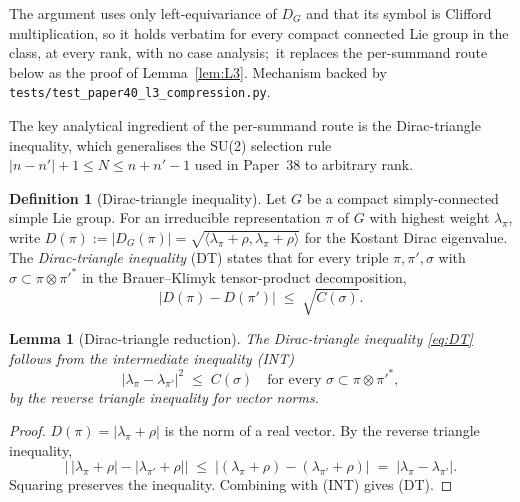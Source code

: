 \documentclass[11pt,a4paper]{article}
\theoremstyle{plain}
\newtheorem{lemma}[theorem]{Lemma}
\theoremstyle{definition}
\newtheorem{definition}[theorem]{Definition}
\newcommand{\Cas}{C}
\newcommand{\Dop}{D}
\begin{document}
\noindent The argument uses only left-equivariance of $\Dop_G$ and
that its symbol is Clifford multiplication, so it holds verbatim for
every compact connected Lie group in the class, at every rank, with no
case analysis;\ it replaces the per-summand route below as the proof of
Lemma~\ref{lem:L3}.  Mechanism backed by
\texttt{tests/test\_paper40\_l3\_compression.py}.

The key analytical ingredient of the per-summand route is the
Dirac-triangle inequality, which generalises the SU(2) selection rule
$|n - n'| + 1 \le N \le n + n' - 1$ used in Paper~38 to arbitrary
rank.

\begin{definition}[Dirac-triangle inequality]\label{def:dirac_triangle}
Let $G$ be a compact simply-connected simple Lie group. For an
irreducible representation $\pi$ of $G$ with highest weight
$\lambda_\pi$, write
$\Dop(\pi) := |\Dop_G(\pi)| = \sqrt{\langle \lambda_\pi + \rho,
\lambda_\pi + \rho \rangle}$ for the Kostant Dirac eigenvalue. The
\emph{Dirac-triangle inequality} (DT) states that for every triple
$\pi, \pi', \sigma$ with $\sigma \subset \pi \otimes \pi'^*$ in the
Brauer--Klimyk tensor-product decomposition,
\begin{equation}\label{eq:DT}
   |\Dop(\pi) - \Dop(\pi')| \;\le\; \sqrt{\Cas(\sigma)}.
\end{equation}
\end{definition}

\begin{lemma}[Dirac-triangle reduction]\label{lem:dt_reduction}
The Dirac-triangle inequality \eqref{eq:DT} follows from the
\emph{intermediate inequality} (INT)
\begin{equation}\label{eq:INT}
   |\lambda_\pi - \lambda_{\pi'}|^2 \;\le\; \Cas(\sigma)
   \quad\text{for every } \sigma \subset \pi \otimes \pi'^*,
\end{equation}
by the reverse triangle inequality for vector norms.
\end{lemma}

\begin{proof}
$\Dop(\pi) = |\lambda_\pi + \rho|$ is the norm of a real vector. By
the reverse triangle inequality,
\begin{equation*}
   \bigl|\,|\lambda_\pi + \rho| - |\lambda_{\pi'} + \rho|\bigr|
   \;\le\; |(\lambda_\pi + \rho) - (\lambda_{\pi'} + \rho)|
   \;=\; |\lambda_\pi - \lambda_{\pi'}|.
\end{equation*}
Squaring preserves the inequality. Combining with (INT) gives (DT).
\end{proof}
\end{document}

